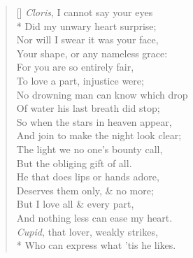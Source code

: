 \documentclass[MAIN]{subfiles}
\begin{document}
\settowidth{\versewidth}{And join to make the night look clear;}
\begin{verse}[\versewidth]
\emph{Cloris}, I cannot say your eyes\\*
Did my unwary heart surprise;\\
Nor will I swear it was your face,\\
Your shape, or any nameless grace:\\
For you are so entirely fair,\\
To love a part, injustice were;\\
No drowning man can know which drop\\
Of water his last breath did stop;\\
So when the stars in heaven appear,\\
And join to make the night look clear;\\
The light we no one's bounty call,\\
But the obliging gift of all.\\
He that does lips or hands adore,\\
Deserves them only, \& no more;\\
But I love all \& every part,\\
And nothing less can ease my heart.\\
\emph{Cupid}, that lover, weakly strikes,\\*
Who can express what 'tis he likes.
\end{verse}
\end{document}
